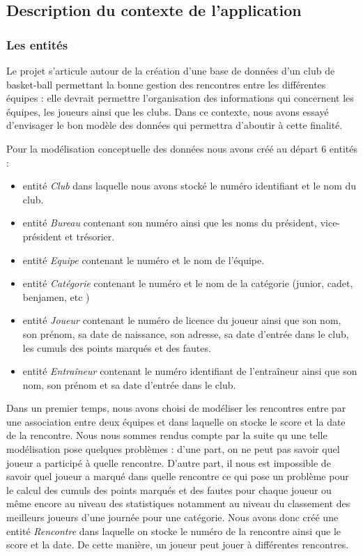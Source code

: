 \documentclass{article}
\begin{document}
\subsection{Description du contexte de l'application}

\subsubsection*{Les entités}
Le projet s’articule autour de la création d’une base de données d’un club de basket-ball permettant la bonne gestion des rencontres entre les différentes équipes : elle devrait permettre l’organisation des informations qui concernent les équipes, les joueurs ainsi que les clubs.
Dans ce contexte, nous avons essayé d’envisager le bon modèle des données qui permettra d’aboutir à cette finalité.

Pour la modélisation conceptuelle des données nous avons créé au départ 6 entités : \\


\begin{itemize}
\item entité \textit{Club} dans laquelle nous avons stocké le numéro identifiant et le nom du club.
\item entité \textit{Bureau} contenant son numéro ainsi que les noms du président, vice-président et trésorier. 
\item entité \textit{Equipe} contenant le numéro et le nom de l'équipe.
\item entité \textit{Catégorie} contenant le numéro et le nom de la catégorie (junior, cadet, benjamen, etc )
\item entité \textit{Joueur} contenant le numéro de licence du joueur ainsi que son nom, son prénom, sa date de naissance, son adresse, sa date d'entrée dans le club, les cumuls des points marqués et des fautes.
\item entité \textit{Entraîneur} contenant le numéro identifiant de l'entraîneur ainsi que son nom, son prénom et sa date d'entrée dans le club. \\
\end{itemize}



Dans un premier temps, nous avons choisi de modéliser les rencontres entre par une association entre deux équipes et dans laquelle on stocke le score et la date de la rencontre. Nous nous sommes rendus compte par la suite qu une telle modélisation pose quelques problèmes : d'une part, on ne peut pas savoir quel joueur a participé à quelle rencontre. D'autre part, il nous est impossible de savoir quel joueur a marqué dans quelle rencontre ce qui pose un problème pour le calcul des cumuls des points marqués et des fautes pour chaque joueur ou même encore au niveau des statistiques notamment au niveau du classement des meilleurs joueurs d'une journée pour une catégorie. Nous avons donc créé une entité \textit{Rencontre} dans laquelle on stocke le numéro de la rencontre ainsi que le score et la date. De cette manière, un joueur peut jouer à différentes rencontres.
\\
\end{document}
